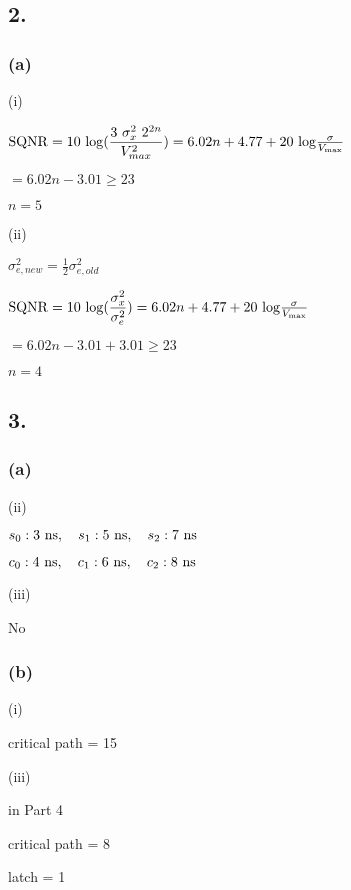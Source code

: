 \documentclass{article}
\begin{document}
\subsection*{2.}
\subsubsection*{(a)}
(i)\par
${\rm SQNR} = 10 \ {\rm log} (\dfrac{3 \ \sigma_{x}^{2} \ 2^{2n}}{V_{max}^{2}}) = 6.02n+4.77+20 \ {\rm log} \frac{\sigma}{V_{\rm max}}$\par\indent
\par
$=6.02n-3.01 \geq 23$\par
$n=5$\par\indent
\par
(ii)\par
$\sigma_{e,new}^{2}=\frac{1}{2}\sigma_{e,old}^{2}$\par\indent
\par
${\rm SQNR} = 10 \ {\rm log} (\dfrac{\sigma_{x}^{2}}{\sigma_{e}^{2}}) = 6.02n+4.77+20 \ {\rm log} \frac{\sigma}{V_{\rm max}} $\par\indent
\par
$=6.02n-3.01+3.01 \geq 23$\par
$n=4$




\subsection*{3.}
\subsubsection*{(a)}
(ii)\par
$s_{0}:3 \ {\rm ns}, \quad s_{1}:5 \ {\rm ns}, \quad s_{2}:7 \ {\rm ns}$\par
$c_{0}:4 \ {\rm ns}, \quad c_{1}:6 \ {\rm ns}, \quad c_{2}:8 \ {\rm ns}$\par\indent
\par
(iii)\par
No

\subsubsection*{(b)}
(i)\par
critical path = 15\par\indent
\par
(iii)\par
in Part 4\par
critical path = 8\par
latch = 1
\end{document}
